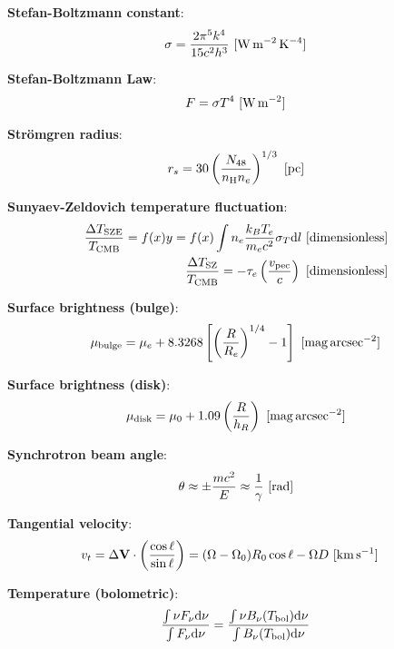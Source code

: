 \documentclass[a4paper,10pt]{article}
\begin{document}
{\noindent}\textbf{Stefan-Boltzmann constant}:
\begin{align*}
    \sigma = \frac{2\pi^5k^4}{15c^2h^3} ~ [{\rm W\,m^{-2}\,K^{-4}}]
\end{align*}

{\noindent}\textbf{Stefan-Boltzmann Law}:
\begin{align*}
    F = \sigma T^4 ~ [{\rm W\,m^{-2}}]
\end{align*}

{\noindent}\textbf{Str\"omgren radius}:
\begin{align*}
    r_s = 30 \left(\frac{N_{48}}{n_{\rm H}n_e}\right)^{1/3} ~ [{\rm pc}]
\end{align*}

{\noindent}\textbf{Sunyaev-Zeldovich temperature fluctuation}:
\begin{align*}
    \frac{\Delta T_\mathrm{SZE}}{T_\mathrm{CMB}} = f(x)y = f(x)\int n_e\frac{k_BT_e}{m_ec^2}\sigma_T \mathrm{d}l ~ [{\rm dimensionless}] \\
    \frac{\Delta T_\mathrm{SZ}}{T_\mathrm{CMB}} = -\tau_e \left(\frac{v_\mathrm{pec}}{c}\right) ~ [{\rm dimensionless}]
\end{align*}

{\noindent}\textbf{Surface brightness (bulge)}:
\begin{align*}
    \mu_\mathrm{bulge} = \mu_e + 8.3268\left[\left(\frac{R}{R_e}\right)^{1/4}-1\right] ~ [{\rm mag\,arcsec^{-2}}]
\end{align*}

{\noindent}\textbf{Surface brightness (disk)}:
\begin{align*}
    \mu_\mathrm{disk} = \mu_0 + 1.09\left(\frac{R}{h_R}\right) ~ {\rm [mag\,arcsec^{-2}}]
\end{align*}

{\noindent}\textbf{Synchrotron beam angle}:
\begin{align*}
    \theta \approx \pm \frac{mc^2}{E} \approx \frac{1}{\gamma} ~ [{\rm rad}]
\end{align*}

{\noindent}\textbf{Tangential velocity}:
\begin{align*}
    v_t &= \Delta\mathbf{V}\cdot\left(\frac{\cos\ell}{\sin\ell}\right) = (\Omega-\Omega_0)R_0\cos\ell - \Omega D ~ [{\rm km\,s^{-1}}]
\end{align*}

{\noindent}\textbf{Temperature (bolometric)}:
\begin{align*}
    \frac{\int\nu F_\nu {\rm d}\nu}{\int F_\nu {\rm d}\nu} = \frac{\int\nu B_\nu(T_{\rm bol}){\rm d}\nu}{\int B_\nu(T_{\rm bol}){\rm d}\nu}
\end{align*}
\end{document}
